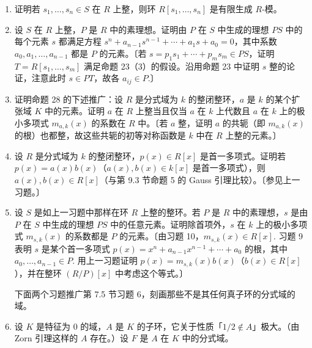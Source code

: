 \begin{enumerate}
（b）假设 \(\mathcal{O}_K\) 的理想 \(Q\) 是 \(P\)-准素的当且仅当 \(Q = P^m\)（某个 \(m \geq 1\)）。在假设定理 21 全部成立的前提下，证明 \(\mathcal{O}_K\) 的每个非零理想 \(I\) 都可以唯一地写成素理想幂之积。〔证明若 \(P_1\) 与 \(P_2\) 是互不相同的非零素理想，则 \(P_1^{m_1}\) 与 \(P_2^{m_2}\) 是互余理想，并利用中国剩余定理。〕

\item 证明若 \(s_1, \ldots, s_n \in S\) 在 \(R\) 上整，则环 \(R[s_1, \ldots, s_n]\) 是有限生成 \(R\)-模。

\item 设 \(S\) 在 \(R\) 上整，\(P\) 是 \(R\) 中的素理想。证明由 \(P\) 在 \(S\) 中生成的理想 \(PS\) 中的每个元素 \(s\) 都满足方程 \(s^n+a_{n-1}s^{n-1}+\cdots+a_1s+a_0 = 0\)，其中系数 \(a_0, a_1, \ldots, a_{n-1}\) 都是 \(P\) 的元素。〔若 \(s = p_1s_1+\cdots+p_ms_m \in PS\)，证明 \(T = R[s_1, \ldots, s_m]\) 满足命题 23（3）的假设。沿用命题 23 中证明 \(s\) 整的论证，注意此时 \(s \in PT\)，故各 \(a_{ij} \in P\).〕

\item 证明命题 28 的下述推广：设 \(R\) 是分式域为 \(k\) 的整闭整环，\(a\) 是 \(k\) 的某个扩张域 \(K\) 中的元素。证明 \(a\) 在 \(R\) 上整当且仅当 \(a\) 在 \(k\) 上代数且 \(a\) 在 \(k\) 上的极小多项式 \(m_{a,k}(x)\) 的系数在 \(R\) 中。〔若 \(a\) 整，证明 \(a\) 的共轭（即 \(m_{a,k}(x)\) 的根）也都整，故这些共轭的初等对称函数是 \(k\) 中在 \(R\) 上整的元素。〕

\item 设 \(R\) 是分式域为 \(k\) 的整闭整环，\(p(x) \in R[x]\) 是首一多项式。证明若 \(p(x) = a(x)b(x)\)（\(a(x), b(x) \in k[x]\) 是首一多项式），则 \(a(x), b(x) \in R[x]\)（与第 9.3 节命题 5 的 Gauss 引理比较）。〔参见上一习题。〕

\item 设 \(S\) 是如上一习题中那样在环 \(R\) 上整的整环。若 \(P\) 是 \(R\) 中的素理想，\(s\) 是由 \(P\) 在 \(S\) 中生成的理想 \(PS\) 中的任意元素。证明除首项外，\(s\) 在 \(k\) 上的极小多项式 \(m_{s,k}(x)\) 的系数都是 \(P\) 的元素。〔由习题 10，\(m_{s,k}(x) \in R[x]\). 习题 9 表明 \(s\) 是某个首一多项式 \(p(x) = x^n+a_{n-1}x^{n-1}+\cdots+a_0\) 的根，其中 \(a_0, \ldots, a_{n-1} \in P\). 用上一习题证明 \(p(x) = m_{s,k}(x)b(x)\)（\(b(x) \in R[x]\)），并在整环 \((R/P)[x]\) 中考虑这个等式。〕

\noindent 下面两个习题推广第 7.5 节习题 6，刻画那些不是其任何真子环的分式域的域。

\item 设 \(K\) 是特征为 0 的域，\(A\) 是 \(K\) 的子环，它关于性质「\(1/2 \notin A\)」极大。（由 Zorn 引理这样的 \(A\) 存在。）设 \(F\) 是 \(A\) 在 \(K\) 中的分式域。


\end{enumerate}
